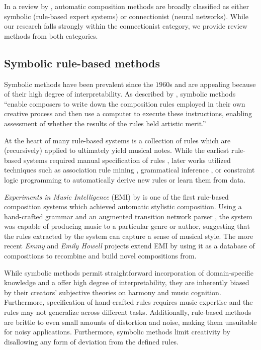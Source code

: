 In a review by \citet{toiviainen2000symbolic}, automatic composition methods
are broadly classified as either symbolic (\eg rule-based expert systems) or
connectionist (\eg neural networks). While our research falls strongly within
the connectionist category, we provide review methods from both categories.

\subsection{Symbolic rule-based methods}

Symbolic methods have been prevalent since the $1960$s
\citep{todd1988sequential} and are appealing because of their high degree of
interpretability. As described by \citet{todd1989connectionist}, symbolic
methods ``enable composers to write down the composition rules employed in
their own creative process and then use a computer to execute these
instructions, enabling assessment of whether the results of the rules held
artistic merit.''

At the heart of many rule-based systems is a collection of rules which are
(recursively) applied to ultimately yield musical notes. While the earliest
rule-based systems required manual specification of rules
\citep{ebciouglu1988expert,cruz1998learning}, later works utilized techniques
such as association rule mining \citep{spangler1998bach}, grammatical inference
\citep{cruz1998learning,quick2014kulitta}, or constraint logic programming
\citep{tsang1991harmonizing} to automatically derive new rules or learn them
from data.

\textit{Experiments in Music Intelligence} (EMI) by
\citet{cope1987experiments,cope1992computer} is one of the first rule-based
composition systems which achieved automatic stylistic composition. Using a
hand-crafted grammar and an augmented transition network
parser \citep{wanner1980atn}, the system was capable of producing music to a
particular genre or author, suggesting that the rules extracted by the system
can capture a sense of musical style. The more recent \textit{Emmy} and
\textit{Emily Howell} projects \citep{cope2013well,cope2010recombinant} extend
EMI by using it as a database of compositions to recombine and build novel
compositions from.

While symbolic methods permit straightforward incorporation of domain-specific
knowledge and a offer high degree of interpretability, they are inherently
biased by their creators' subjective theories on harmony and music cognition.
Furthermore, specification of hand-crafted rules requires music expertise and
the rules may not generalize across different tasks. Additionally, rule-based
methods are brittle to even small amounts of distortion and noise, making them
unsuitable for noisy applications. Furthermore, symbolic methods limit
creativity by disallowing any form of deviation from the defined rules.

